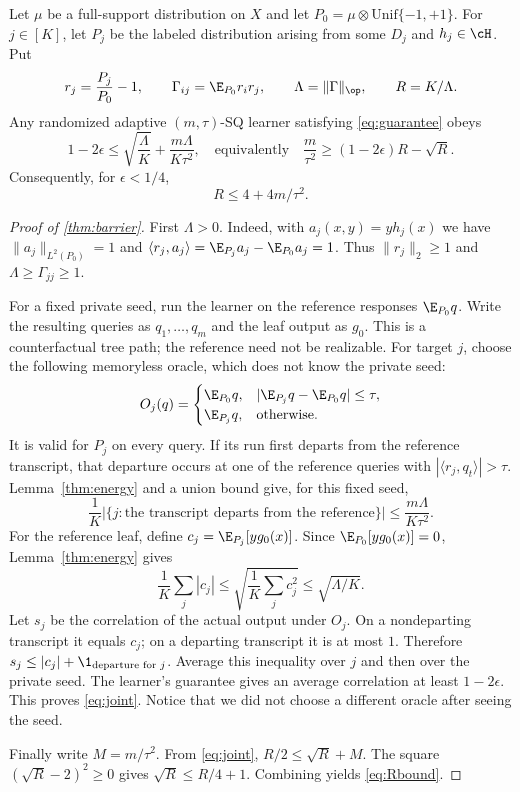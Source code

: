\begin{theorem}\label{thm:barrier}
Let $\mu$ be a full-support distribution on $X$ and let $P_0=\mu\otimes\mathrm{Unif}\{-1,+1\}$. For $j\in[K]$, let $P_j$ be the labeled distribution arising from some $D_j$ and $h_j\in\cH$. Put
\[
 r_j=\frac{P_j}{P_0}-1,\qquad
 \Gamma_{ij}=\E_{P_0}r_i r_j,\qquad
 \Lambda=\|\Gamma\|_\op,\qquad R=K/\Lambda.
\]
Any randomized adaptive $(m,\tau)$-SQ learner satisfying \eqref{eq:guarantee} obeys
\begin{equation}\label{eq:joint}
 1-2\epsilon\leq\sqrt{\frac\Lambda K}+
 \frac{m\Lambda}{K\tau^2},
 \quad\text{equivalently}\quad
 \frac m{\tau^2}\geq(1-2\epsilon)R-\sqrt R.
\end{equation}
Consequently, for $\epsilon<1/4$,
\begin{equation}\label{eq:Rbound}
 R\leq4+4m/\tau^2.
\end{equation}
\end{theorem}

\begin{proof}[Proof of \cref{thm:barrier}]
First $\Lambda>0$. Indeed, with $a_j(x,y)=y h_j(x)$ we have $\|a_j\|_{L^2(P_0)}=1$ and
$\langle r_j,a_j\rangle=\E_{P_j}a_j-\E_{P_0}a_j=1$. Thus $\|r_j\|_2\geq1$ and $\Lambda\geq\Gamma_{jj}\geq1$.

For a fixed private seed, run the learner on the reference responses $\E_{P_0}q$. Write the resulting queries as $q_1,\ldots,q_m$ and the leaf output as $g_0$. This is a counterfactual tree path; the reference need not be realizable. For target $j$, choose the following memoryless oracle, which does not know the private seed:
\[
 O_j(q)=
 \begin{cases}
 \E_{P_0}q,&|\E_{P_j}q-\E_{P_0}q|\leq\tau,\\
 \E_{P_j}q,&\text{otherwise}.
 \end{cases}
\]
It is valid for $P_j$ on every query. If its run first departs from the reference transcript, that departure occurs at one of the reference queries with $|\langle r_j,q_t\rangle|>\tau$. Lemma~\ref{thm:energy} and a union bound give, for this fixed seed,
\[
 \frac1K\bigl|\{j:\text{the transcript departs from the reference}\}\bigr|
 \leq\frac{m\Lambda}{K\tau^2}.
\]
For the reference leaf, define $c_j=\E_{P_j}[y g_0(x)]$. Since $\E_{P_0}[y g_0(x)]=0$, Lemma~\ref{thm:energy} gives
\[
 \frac1K\sum_j|c_j|\leq
 \sqrt{\frac1K\sum_jc_j^2}\leq\sqrt{\Lambda/K}.
\]
Let $s_j$ be the correlation of the actual output under $O_j$. On a nondeparting transcript it equals $c_j$; on a departing transcript it is at most $1$. Therefore
$s_j\leq|c_j|+\1_{\text{departure for }j}$.
Average this inequality over $j$ and then over the private seed. The learner's guarantee gives an average correlation at least $1-2\epsilon$. This proves \eqref{eq:joint}. Notice that we did not choose a different oracle after seeing the seed.

Finally write $M=m/\tau^2$. From \eqref{eq:joint}, $R/2\leq\sqrt R+M$. The square $(\sqrt R-2)^2\geq0$ gives $\sqrt R\leq R/4+1$. Combining yields \eqref{eq:Rbound}.
\end{proof}
